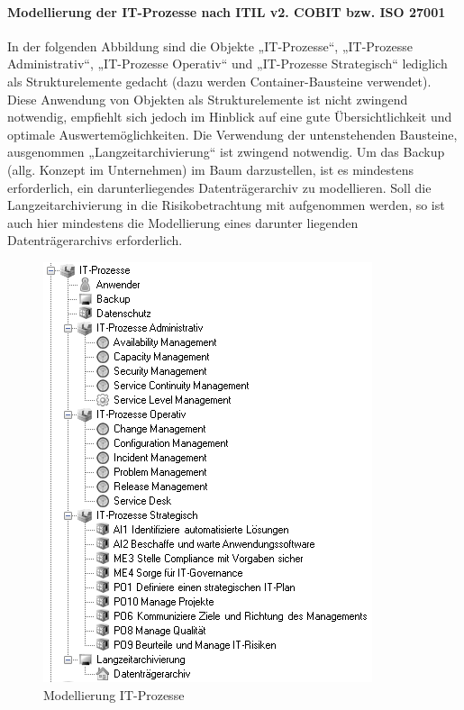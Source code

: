 \paragraph{Modellierung der IT-Prozesse nach ITIL v2. COBIT bzw. ISO 27001}
In der folgenden Abbildung sind die Objekte „IT-Prozesse“, „IT-Prozesse Administrativ“, „IT-Prozesse Operativ“ und „IT-Prozesse Strategisch“ lediglich als Strukturelemente gedacht (dazu werden Container-Bausteine verwendet). Diese Anwendung von Objekten als Strukturelemente ist nicht zwingend notwendig, empfiehlt sich jedoch im Hinblick auf eine gute Übersichtlichkeit und optimale Auswertemöglichkeiten. Die Verwendung der untenstehenden Bausteine, ausgenommen „Langzeitarchivierung“ ist zwingend notwendig.
Um das Backup (allg. Konzept im Unternehmen) im Baum darzustellen, ist es mindestens erforderlich, ein darunterliegendes Datenträgerarchiv zu modellieren.
Soll die Langzeitarchivierung in die Risikobetrachtung mit aufgenommen werden, so ist auch hier mindestens die Modellierung eines darunter liegenden Datenträgerarchivs erforderlich.
\begin{figure}[htbp]
	\centering
	\includegraphics[scale =1 ]{images/prozesse.png}
	\caption{Modellierung IT-Prozesse}
	\label{fig:bsp}
\end{figure}
